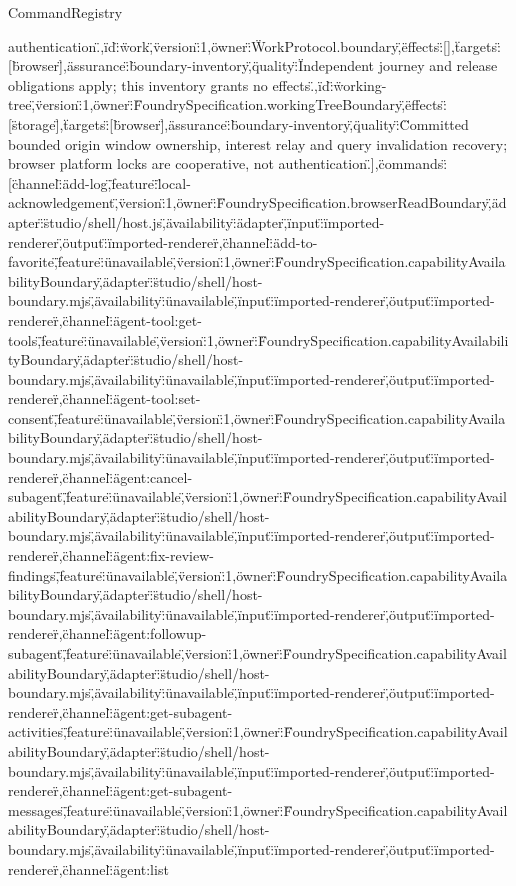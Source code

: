\begin{lexlean}{CommandRegistry}
\begin{semanticmodule}
{authentication.\"},{\"id\":\"work\",\"version\":1,\"owner\":\"WorkProtocol.boundary\",\"effects\":[],\"targets\":[\"browser\"],\"assurance\":\"boundary-inventory\",\"quality\":\"Independent journey and release obligations apply; this inventory grants no effects.\"},{\"id\":\"working-tree\",\"version\":1,\"owner\":\"FoundrySpecification.workingTreeBoundary\",\"effects\":[\"storage\"],\"targets\":[\"browser\"],\"assurance\":\"boundary-inventory\",\"quality\":\"Committed bounded origin window ownership, interest relay and query invalidation recovery; browser platform locks are cooperative, not authentication.\"}],\"commands\":[{\"channel\":\"add-log\",\"feature\":\"local-acknowledgement\",\"version\":1,\"owner\":\"FoundrySpecification.browserReadBoundary\",\"adapter\":\"studio/shell/host.js\",\"availability\":\"adapter\",\"input\":\"imported-renderer\",\"output\":\"imported-renderer\"},{\"channel\":\"add-to-favorite\",\"feature\":\"unavailable\",\"version\":1,\"owner\":\"FoundrySpecification.capabilityAvailabilityBoundary\",\"adapter\":\"studio/shell/host-boundary.mjs\",\"availability\":\"unavailable\",\"input\":\"imported-renderer\",\"output\":\"imported-renderer\"},{\"channel\":\"agent-tool:get-tools\",\"feature\":\"unavailable\",\"version\":1,\"owner\":\"FoundrySpecification.capabilityAvailabilityBoundary\",\"adapter\":\"studio/shell/host-boundary.mjs\",\"availability\":\"unavailable\",\"input\":\"imported-renderer\",\"output\":\"imported-renderer\"},{\"channel\":\"agent-tool:set-consent\",\"feature\":\"unavailable\",\"version\":1,\"owner\":\"FoundrySpecification.capabilityAvailabilityBoundary\",\"adapter\":\"studio/shell/host-boundary.mjs\",\"availability\":\"unavailable\",\"input\":\"imported-renderer\",\"output\":\"imported-renderer\"},{\"channel\":\"agent:cancel-subagent\",\"feature\":\"unavailable\",\"version\":1,\"owner\":\"FoundrySpecification.capabilityAvailabilityBoundary\",\"adapter\":\"studio/shell/host-boundary.mjs\",\"availability\":\"unavailable\",\"input\":\"imported-renderer\",\"output\":\"imported-renderer\"},{\"channel\":\"agent:fix-review-findings\",\"feature\":\"unavailable\",\"version\":1,\"owner\":\"FoundrySpecification.capabilityAvailabilityBoundary\",\"adapter\":\"studio/shell/host-boundary.mjs\",\"availability\":\"unavailable\",\"input\":\"imported-renderer\",\"output\":\"imported-renderer\"},{\"channel\":\"agent:followup-subagent\",\"feature\":\"unavailable\",\"version\":1,\"owner\":\"FoundrySpecification.capabilityAvailabilityBoundary\",\"adapter\":\"studio/shell/host-boundary.mjs\",\"availability\":\"unavailable\",\"input\":\"imported-renderer\",\"output\":\"imported-renderer\"},{\"channel\":\"agent:get-subagent-activities\",\"feature\":\"unavailable\",\"version\":1,\"owner\":\"FoundrySpecification.capabilityAvailabilityBoundary\",\"adapter\":\"studio/shell/host-boundary.mjs\",\"availability\":\"unavailable\",\"input\":\"imported-renderer\",\"output\":\"imported-renderer\"},{\"channel\":\"agent:get-subagent-messages\",\"feature\":\"unavailable\",\"version\":1,\"owner\":\"FoundrySpecification.capabilityAvailabilityBoundary\",\"adapter\":\"studio/shell/host-boundary.mjs\",\"availability\":\"unavailable\",\"input\":\"imported-renderer\",\"output\":\"imported-renderer\"},{\"channel\":\"agent:list}
\end{semanticmodule}
\end{lexlean}
